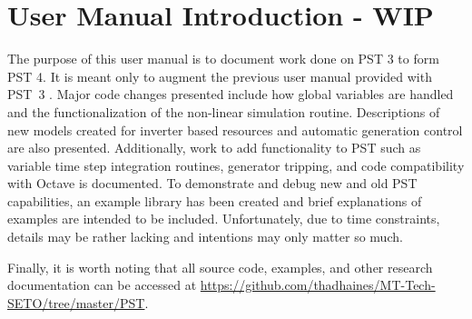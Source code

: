 \vspace{2em} %
\chapter*{User Manual Introduction  - WIP}

\vspace{1em}
The purpose of this user manual is to document work done on PST 3 to form PST 4. 
It is meant only to augment the previous user manual provided with \mbox{PST 3} \cite{PST3manual}.
%
Major code changes presented include 
how global variables are handled
and the
functionalization of the non-linear simulation routine.
%
Descriptions of new models created for
inverter based resources
and
automatic generation control
are also presented.
%
Additionally, work to add functionality to PST such as
variable time step integration routines,
generator tripping, %
and
code compatibility with Octave
is documented.
%
To demonstrate and debug new and old PST capabilities, an example library has been created and brief explanations of examples are intended to be included.
Unfortunately, due to time constraints, details may be rather lacking and intentions may only matter so much.

\vspace{1em}
Finally, it is worth noting that all source code, examples, and other research documentation can be accessed at 
\href{https://github.com/thadhaines/MT-Tech-SETO/tree/master/PST}{https://github.com/thadhaines/MT-Tech-SETO/tree/master/PST}.